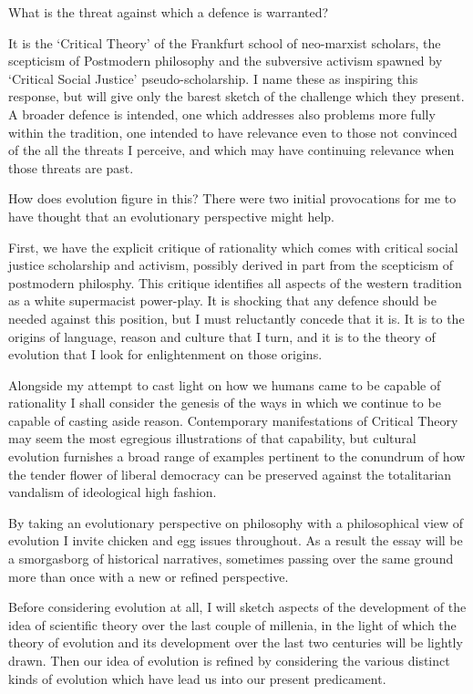 \documentclass[10pt,titlepage]{article}
\begin{document}
What is the threat against which a defence is warranted?

It is the `Critical Theory' of the Frankfurt school of neo-marxist scholars, the scepticism of Postmodern philosophy and the subversive activism spawned by `Critical Social Justice' pseudo-scholarship.
I name these as inspiring this response, but will give only the barest sketch of the challenge which they present.
A broader defence is intended, one which addresses also problems more fully within the tradition, one intended to have relevance even to those not convinced of the all the threats I perceive, and which may have continuing relevance when those threats are past.

How does evolution figure in this?
There were two initial provocations for me to have thought that an evolutionary perspective might help.

First, we have the explicit critique of rationality which comes with critical social justice scholarship and activism, possibly derived in part from the scepticism of postmodern philosphy.
This critique identifies all aspects of the western tradition as a white supermacist power-play.
It is shocking that any defence should be needed against this position, but I must reluctantly concede that it is.
It is to the origins of language, reason and culture that I turn, and it is to the theory of evolution that I look for enlightenment on those origins.

Alongside my attempt to cast light on how we humans came to be capable of rationality I shall consider the genesis of the ways in which we continue to be capable of casting aside reason.
Contemporary manifestations of Critical Theory may seem the most egregious illustrations of that capability, but cultural evolution furnishes a broad range of examples pertinent to the conundrum of how the tender flower of liberal democracy can be preserved against the totalitarian vandalism of ideological high fashion.

By taking an evolutionary perspective on philosophy with a philosophical view of evolution I invite chicken and egg issues throughout.
As a result the essay will be a smorgasborg of historical narratives, sometimes passing over the same ground more than once with a new or refined perspective.

Before considering evolution at all, I will sketch aspects of the development of the idea of scientific theory over the last couple of millenia, in the light of which the theory of evolution and its development over the last two centuries will be lightly drawn.
Then our idea of evolution is refined by considering the various distinct kinds of evolution which have lead us into our present predicament.
\end{document}
